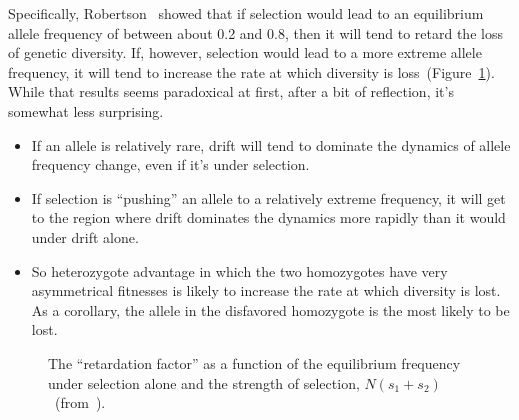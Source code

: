 Specifically, Robertson~\cite{Robertson-1962} showed that if selection
would lead to an equilibrium allele frequency of between about 0.2 and
0.8, then it will tend to retard the loss of genetic diversity. If,
however, selection would lead to a more extreme allele frequency, it
will tend to increase the rate at which diversity is
loss~(Figure~\ref{fig:drift-heterozygote-advantage}). While that
results seems paradoxical at first, after a bit of reflection, it's
somewhat less surprising.

\begin{itemize}

\item If an allele is relatively rare, drift will tend to dominate the
  dynamics of allele frequency change, even if it's under selection.

\item If selection is ``pushing'' an allele to a relatively extreme
  frequency, it will get to the region where drift dominates the
  dynamics more rapidly than it would under drift alone.

\item So heterozygote advantage in which the two homozygotes have very
  asymmetrical fitnesses is likely to increase the rate at which
  diversity is lost. As a corollary, the allele in the disfavored
  homozygote is the most likely to be lost.

\end{itemize}

\begin{figure}
\begin{center}
\end{center}
\caption{The ``retardation factor'' as a function of the equilibrium
  frequency under selection alone and the strength of selection,
  $N(s_1+s_2)$~(from~\cite{Robertson-1962}).}\label{fig:drift-heterozygote-advantage} 
\end{figure}


